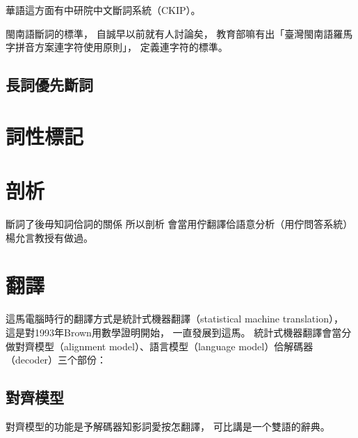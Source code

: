 華語這方面有中研院中文斷詞系統（CKIP）\cite{CKIP論文}。

閩南語斷詞的標準，
自誠早以前就有人討論矣\cite{台語斷詞原則討論}，
教育部嘛有出「臺灣閩南語羅馬字拼音方案連字符使用原則」\cite{臺羅拼音}，
定義連字符的標準。




\subsection{長詞優先斷詞}
\label{節：長詞優先斷詞}


\section{詞性標記}
\label{節：詞性標記}
\cite{iunn:利用統計方法及中文訓練資料處理台語文詞性標記}

\section{剖析}
\label{節：剖析}
斷詞了後毋知詞佮詞的關係
所以剖析
會當用佇翻譯佮語意分析（用佇問答系統）
楊允言教授有做過\cite{台語文語法結構樹建置}。
\section{翻譯}
\label{節：翻譯}
這馬電腦時行的翻譯方式是統計式機器翻譯（statistical machine translation），
這是對1993年Brown用數學證明\cite{brown1993mathematics}開始，
一直發展到這馬。
統計式機器翻譯會當分做對齊模型（alignment model）、語言模型（language model）佮解碼器（decoder）三个部份：

\subsection{對齊模型}
\label{小節：對齊模型}
對齊模型的功能是予解碼器知影詞愛按怎翻譯，
可比講是一个雙語的辭典。

